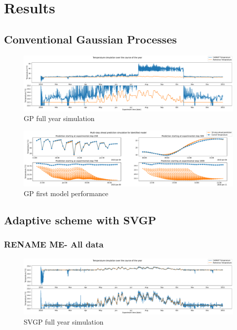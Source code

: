 \section{Results}

\subsection{Conventional Gaussian Processes}

\begin{figure}[ht]
    \centering
    \includegraphics[width =
    \textwidth]{Plots/4_GP_480pts_12_averageYear_fullyear.pdf}
    \caption{GP full year simulation}
    \label{fig:GP_fullyear_simulation}
\end{figure}

\begin{figure}[ht]
    \centering
    \includegraphics[width =
    \textwidth]{Plots/4_GP_480pts_12_averageYear_first_model_performance.pdf}
    \caption{GP first model performance}
    \label{fig:GP_first_model_performance}
\end{figure}

\clearpage

\subsection{Adaptive scheme with SVGP}

\subsubsection{RENAME ME- All data}

\begin{figure}[ht]
    \centering
    \includegraphics[width =
    \textwidth]{Plots/1_SVGP_480pts_inf_window_12_averageYear_fullyear.pdf}
    \caption{SVGP full year simulation}
    \label{fig:SVGP_fullyear_simulation}
\end{figure}

